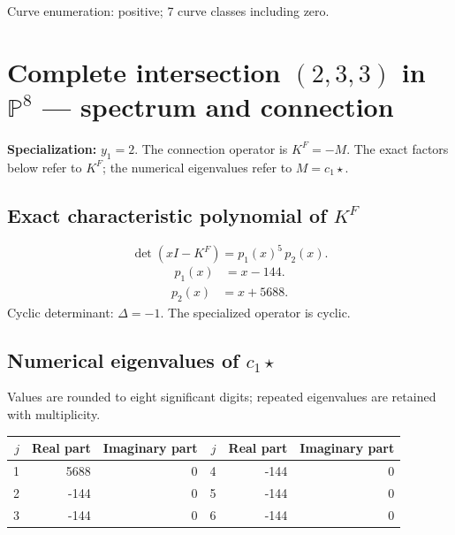 \documentclass[10pt,a4paper]{article}
\begin{document}
Curve enumeration: positive; 7 curve classes including zero.
\clearpage\section*{Complete intersection $(2,3,3)$ in $\mathbb P^{8}$ --- spectrum and connection}
\textbf{Specialization:} $y_1=2$. The connection operator is $K^F=-M$. The exact factors below refer to $K^F$; the numerical eigenvalues refer to $M=c_1\star$.
\subsection*{Exact characteristic polynomial of $K^F$}
\[\det(xI-K^F)=p_{1}(x)^{5}\,p_{2}(x).\]
\[\begin{aligned}p_{1}(x)&=x - 144.\end{aligned}\]
\[\begin{aligned}p_{2}(x)&=x + 5688.\end{aligned}\]
Cyclic determinant: $\Delta=-1$. The specialized operator is cyclic.
\subsection*{Numerical eigenvalues of $c_1\star$}
Values are rounded to eight significant digits; repeated eigenvalues are retained with multiplicity.
\begin{center}\small\begin{tabular}{rrr@{\qquad}rrr}\toprule $j$ & Real part & Imaginary part & $j$ & Real part & Imaginary part\\\midrule
1 & 5688 & 0 & 4 & -144 & 0\\
2 & -144 & 0 & 5 & -144 & 0\\
3 & -144 & 0 & 6 & -144 & 0\\
\bottomrule\end{tabular}\end{center}
\end{document}
